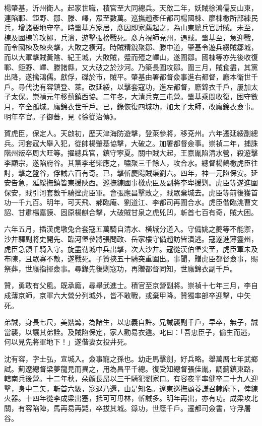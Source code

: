 \begin{pinyinscope}
楊肇基，沂州衛人。起家世職，積官至大同總兵。天啟二年，妖賊徐鴻儒反山東，連陷鄆、鉅野、鄒、滕、嶧，眾至數萬。巡撫趙彥任都司楊國棟、廖棟檄所部練民兵，增諸要地守卒。時肇基方家居，彥因即家薦起之，為山東總兵官討賊。未至，棟及國棟等攻鄒，兵潰，遊擊張榜戰死。彥方視師兗州，遇賊。肇基至，急迎戰，而令國棟及棟夾擊，大敗之橫河。時賊精銳聚鄒、滕中道，肇基令遊兵綴賊鄒城，而以大軍擊賊黃陰、紀王城，大敗賊，蹙而殪之嶧山，遂圍鄒。國棟等亦先後收復鄆、鉅野、嶧、滕諸縣，又大破之於沙河。乃築長圍攻鄒。圍三月，賊食盡，其黨出降，遂擒鴻儒。獻俘，磔於市，賊平。肇基由署都督僉事進右都督，廕本衛世千戶。尋代沈有容鎮登、萊。改延綏，以擊套寇功，進左都督，廕錦衣千戶，屢加太子太保。崇禎元年移薊鎮西協。二年冬，大清兵克三屯營。肇基乘間收復，困守數月，卒全孤城。廕錦衣世千戶。已，錄恢復四城功，加太子太師，改廕錦衣僉事。明年卒官。子御蕃，見《徐從治傳》。

賀虎臣，保定人。天啟初，歷天津海防遊擊，登萊參將，移兗州。六年遷延綏副總兵。河套寇大舉入犯，從帥楊肇基協擊，大破之。加署都督僉事。崇禎二年，捕誅階州叛卒周大旺等。擢總兵官，鎮守寧夏。關中賊大起，王嘉胤陷清水營，殺遊擊李顯宗，遂陷府谷。其黨李老柴應之，嘯聚三千餘人，攻合水。總督楊鶴檄虎臣往討，擊之盤谷，俘馘六百有奇。已，擊斬慶陽賊渠劉六。四年，神一元陷保安。延安告急，延綏撫鎮皆東援陜西。巡撫練國事檄虎臣及副將李卑援剿。虎臣等遂進圍保安，賊引河套數千騎挫虎臣軍。會張應昌擊敗之，賊眾棄城去。虎臣等前後獲首功一千九百。明年，可天飛、郝臨庵、劉道江、李都司再圍合水。虎臣偕臨洮曹文詔、甘肅楊嘉謨、固原楊麒合擊，大破賊甘泉之虎兕凹，斬首七百有奇，賊大困。

六年五月，插漢虎墩兔合套寇五萬騎自清水、橫城分道入。守備姚之夔等不能禦，沙井驛副將史開先、臨河堡參將張問政、岳家樓守備趙訪皆潰逃。寇遂進薄靈州，虎臣急領千騎入守。旋盡勒城中兵出擊，次大沙井。寇從漢伯堡突至，虎臣軍未及布陳，且眾寡不敵，遂戰死。子贊挾五十騎突重圍出。事聞，贈虎臣都督僉事，賜祭葬，世廕指揮僉事。尋錄先後剿寇功，再贈都督同知，世廕錦衣副千戶。

贊，勇敢有父風。既承廕，尋舉武進士。積官至京營副將。崇禎十七年三月，李自成薄京師，京軍六大營分列城外，皆不敢戰，或棄甲降。贊獨率部卒迎擊，中矢死。

弟誠，身長七尺，美鬚髯，為諸生，以忠義自許。兄誡襲副千戶，早卒，無子，誠當襲，以讓其弟詮。及賊陷保定，家人勸易衣遁。叱曰：「吾忠臣子，偷生而逃，何以見先將軍地下！」遂偕妻女投井死。

沈有容，字士弘，宣城入。僉事寵之孫也。幼走馬擊劍，好兵略。舉萬曆七年武鄉試。薊遼總督梁夢龍見而異之，用為昌平千總。復受知總督張佳胤，調薊鎮東路，轄南兵後營。十二年秋，朵顏長昂以三千騎犯劉家口。有容夜半率健卒二十九人迎擊，身中二矢，斬首六級，寇退乃還，由是知名。遼東巡撫顧養謙召隸麾下，俾練火器。十四年從李成梁出塞，抵可可毋林，斬馘多。明年再出，亦有功。成梁攻北關，有容陷陣，馬再易再斃，卒拔其城。錄功，世廕千戶。遷都司僉書，守浮屠谷。


\end{pinyinscope}
